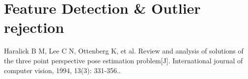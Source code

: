 \documentclass[aspectratio=169, compress]{beamer}
\begin{document}
\section{Feature Detection \& Outlier rejection}
	
	\begin{thebibliography}{00}
	 Haralick B M, Lee C N, Ottenberg K, et al. Review and analysis of solutions of the three point perspective pose estimation problem[J]. International journal of computer vision, 1994, 13(3): 331-356..
	\end{thebibliography}	
	
\end{document}
